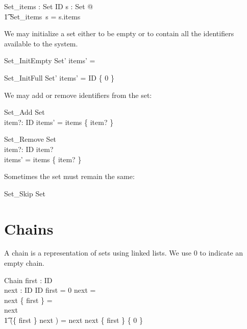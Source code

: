 \documentclass{article}
\begin{document}
\begin{axdef}
	Set\_items : Set \fun \finset ID
\where
	\forall s : Set @ \\
\t1 		Set\_items~s = s.items 
\end{axdef}

We may initialize a set either to be empty or to contain all the
identifiers available to the system.

\begin{schema}{Set\_InitEmpty}
	Set' 
\where
	items' = \emptyset
\end{schema}

\begin{schema}{Set\_InitFull}
	Set'
\where
	items' = ID \setminus \{ 0 \}
\end{schema}

We may add or remove identifiers from the set:

\begin{schema}{Set\_Add}
	\Delta Set \\
	item?: ID
\where
	items' = items \cup \{ item? \} 
\end{schema}

\begin{schema}{Set\_Remove}
	\Delta Set \\
	item?: ID
\where
	item?  \\
	items' = items \setminus \{ item? \} 
\end{schema}

Sometimes the set must remain the same:

\begin{schema}{Set\_Skip}
	\Xi Set
\end{schema}

\section{Chains}

A chain is a representation of sets using linked lists. We use 0 to
indicate an empty chain.

\begin{schema}{Chain}
	first : ID \\ next : ID \finj ID
\where
	first = 0 \implies next = \emptyset \\ next \rres \{ first \}
	= \emptyset \\ next \neq \emptyset \implies \\
\t1		\ran (\{ first \} \dres next \star) = \dom next \cup
\ran next \cup \{ first \} \setminus \{ 0 \} \end{schema}
\end{document}
